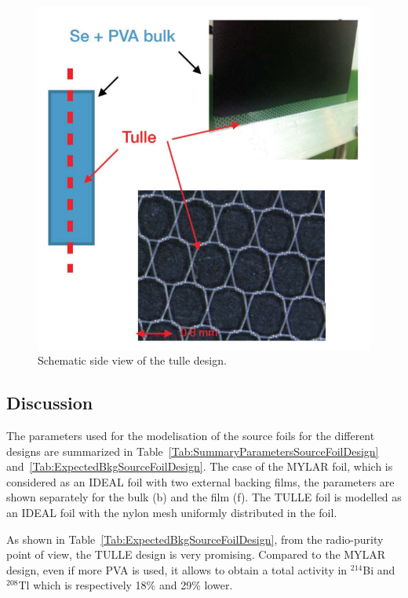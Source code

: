 \documentclass[main.tex]{subfiles}
\begin{document}
\begin{figure}[h!]
\centering
\includegraphics[scale=0.2]{pictures/Chap4/TulleDesign.png}
\caption{Schematic side view of the tulle design.}
\label{TulleDesign}
\end{figure}


\FloatBarrier


\subsection{Discussion}\label{sec:SourceFoilDesignDiscussion}


\NI The parameters used for the modelisation of the source foils for the different designs are summarized in Table~\ref{Tab:SummaryParametersSourceFoilDesign} and~\ref{Tab:ExpectedBkgSourceFoilDesign}. The case of the MYLAR foil, which is considered as an IDEAL foil with two external backing films, the parameters are shown separately for the bulk (b) and the film (f). The TULLE foil is modelled as an IDEAL foil with the nylon mesh uniformly distributed in the foil.


\bigskip


\NI As shown in Table~\ref{Tab:ExpectedBkgSourceFoilDesign}, from the radio-purity point of view, the TULLE design is very promising. Compared to the MYLAR design, even if more PVA is used, it allows to obtain a total activity in $^{\text{214}}$Bi and $^{\text{208}}$Tl which is respectively 18\% and 29\% lower. 
\end{document}

